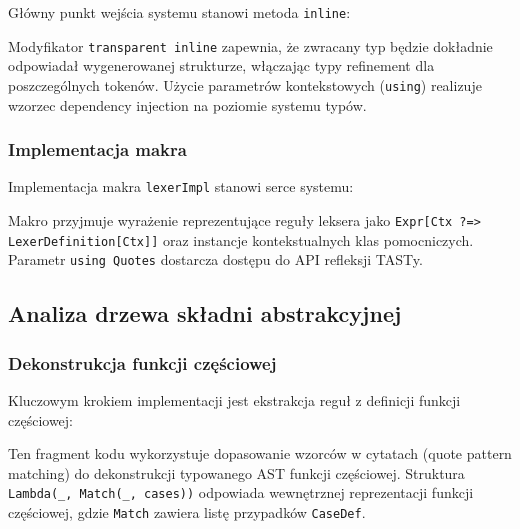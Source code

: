 Główny punkt wejścia systemu stanowi metoda \texttt{inline}:



Modyfikator \texttt{transparent inline} zapewnia, że zwracany typ będzie dokładnie odpowiadał wygenerowanej strukturze, włączając typy refinement dla poszczególnych tokenów.
Użycie parametrów kontekstowych (\texttt{using}) realizuje wzorzec dependency injection na poziomie systemu typów.

\subsubsection{Implementacja makra}\label{subsubsec:implementacja-makra}

Implementacja makra \texttt{lexerImpl} stanowi serce systemu:



Makro przyjmuje wyrażenie reprezentujące reguły leksera jako \texttt{Expr[Ctx ?=> LexerDefinition[Ctx]]} oraz instancje kontekstualnych klas pomocniczych.
Parametr \texttt{using Quotes} dostarcza dostępu do API refleksji TASTy.

\subsection{Analiza drzewa składni abstrakcyjnej}\label{subsec:analiza-drzewa-skadni-abstrakcyjnej}

\subsubsection{Dekonstrukcja funkcji częściowej}\label{subsubsec:dekonstrukcja-funkcji-czesciowej}

Kluczowym krokiem implementacji jest ekstrakcja reguł z definicji funkcji częściowej:



Ten fragment kodu wykorzystuje dopasowanie wzorców w cytatach (quote pattern matching) do dekonstrukcji typowanego AST funkcji częściowej.
Struktura \texttt{Lambda(\_, Match(\_, cases))} odpowiada wewnętrznej reprezentacji funkcji częściowej, gdzie \texttt{Match} zawiera listę przypadków \texttt{CaseDef}.

